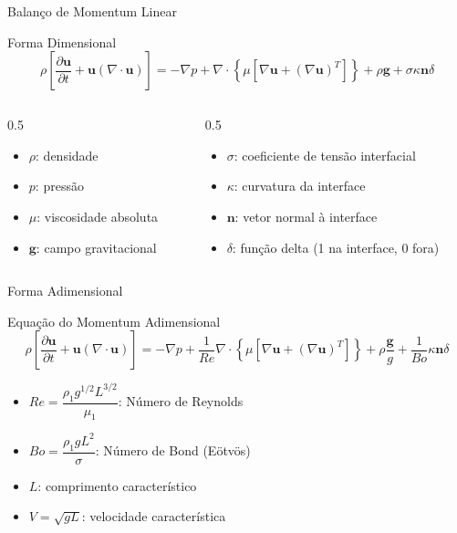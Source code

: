 \documentclass[../main/main.tex]{subfiles}
\begin{document}
\begin{frame}{Balanço de Momentum Linear}
  \begin{block}{Forma Dimensional}
    \scriptsize
    \[
      \rho\left[\frac{\partial\mathbf{u}}{\partial t} + \mathbf{u}(\nabla\cdot\mathbf{u})\right] = -\nabla p + \nabla\cdot\left\{\mu\left[\nabla\mathbf{u} + (\nabla\mathbf{u})^{T}\right]\right\} + \rho\mathbf{g} + \sigma\kappa\mathbf{n}\delta
    \]
  \end{block}
  \vspace{0.3cm}
  \begin{columns}[T]
    \begin{column}{0.5\textwidth}
      \begin{itemize}
        \item $\rho$: densidade
        \item $p$: pressão
        \item $\mu$: viscosidade absoluta
        \item $\mathbf{g}$: campo gravitacional
      \end{itemize}
    \end{column}
    \begin{column}{0.5\textwidth}
      \begin{itemize}
        \item $\sigma$: coeficiente de tensão interfacial
        \item $\kappa$: curvatura da interface
        \item $\mathbf{n}$: vetor normal à interface
        \item $\delta$: função delta (1 na interface, 0 fora)
      \end{itemize}
    \end{column}
  \end{columns}
\end{frame}

\begin{frame}{Forma Adimensional}
  \begin{block}{Equação do Momentum Adimensional}
    \scriptsize
    \[
      \rho\left[\frac{\partial\mathbf{u}}{\partial t} + \mathbf{u}(\nabla\cdot\mathbf{u})\right] = -\nabla p + \frac{1}{Re}\nabla\cdot\left\{\mu\left[\nabla\mathbf{u} + (\nabla\mathbf{u})^{T}\right]\right\} + \rho\frac{\mathbf{g}}{g} + \frac{1}{Bo}\kappa\mathbf{n}\delta
    \]
  \end{block}
  \vspace{0.5cm}
  \begin{itemize}
    \item $Re = \dfrac{\rho_1 g^{1/2} L^{3/2}}{\mu_1}$: Número de Reynolds
    \item $Bo = \dfrac{\rho_1 g L^2}{\sigma}$: Número de Bond (Eötvös)
    \item $L$: comprimento característico
    \item $V = \sqrt{g L}$: velocidade característica
  \end{itemize}
\end{frame}
\end{document}

